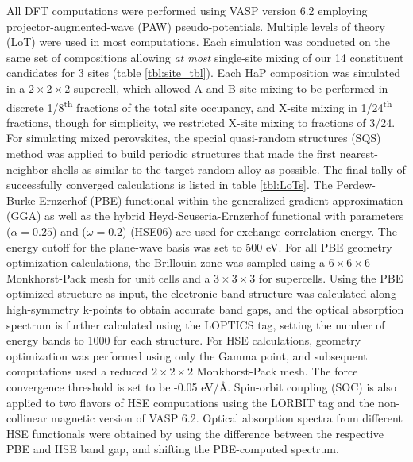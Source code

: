 All DFT computations were performed using VASP version 6.2
\autocite{kresse-1996-effic-iterat,kresse-1993-ab-initio}
employing projector-augmented-wave (PAW) pseudo-potentials.
\autocite{kresse-1996-effic-ab,kresse-1999-from-ultras,kresse-1994-norm-conser}
Multiple levels of theory (LoT) were used in most computations.
Each simulation was conducted on the same set of compositions allowing \emph{at most} single-site mixing of our 14 constituent candidates for 3 sites (table \ref{tbl:site_tbl}).
Each HaP composition was simulated in a \(2\times{}2\times{}2\) supercell, which allowed A and B-site mixing to be performed in discrete 1/8\textsuperscript{th} fractions of the total site occupancy, and X-site mixing in 1/24\textsuperscript{th} fractions, though for simplicity, we restricted X-site mixing to fractions of 3/24.
For simulating mixed perovskites, the special quasi-random structures (SQS) method was applied to build periodic structures that made the first nearest-neighbor shells as similar to the target random alloy as possible.
\autocite{jiang-2016-special-quasir}
The final tally of successfully converged calculations is listed in table \ref{tbl:LoTs}.
The Perdew-Burke-Ernzerhof (PBE) functional within the generalized gradient approximation (GGA) as well as the hybrid Heyd-Scuseria-Ernzerhof functional with parameters (\(\alpha=0.25\)) and (\(\omega=0.2\)) (HSE06) are used for exchange-correlation energy.
\autocite{perdew-1996-gener-gradien,heyd-2003-hybrid-funct}
The energy cutoff for the plane-wave basis was set to 500 \unit{\electronvolt}.
For all PBE geometry optimization calculations, the Brillouin zone was sampled using a \(6\times{}6\times{}6\) Monkhorst-Pack mesh for unit cells and a \(3\times{}3\times{}3\) for supercells.
Using the PBE optimized structure as input, the electronic band structure was calculated along high-symmetry k-points to obtain accurate band gaps, and the optical absorption spectrum is further calculated using the LOPTICS tag, setting the number of energy bands to 1000 for each structure.
\autocite{hinuma-2016-band-struc,ganose-2018-sumo}
For HSE calculations, geometry optimization was performed using only the Gamma point, and subsequent computations used a reduced \(2\times{}2\times{}2\) Monkhorst-Pack mesh.
The force convergence threshold is set to be -0.05 eV/Å.
Spin-orbit coupling (SOC) is also applied to two flavors of HSE computations using the LORBIT tag and the non-collinear magnetic version of VASP 6.2.
\autocite{steiner-2016-calcul-magnet}
Optical absorption spectra from different HSE functionals were obtained by using the difference between the respective PBE and HSE band gap, and shifting the PBE-computed spectrum.

